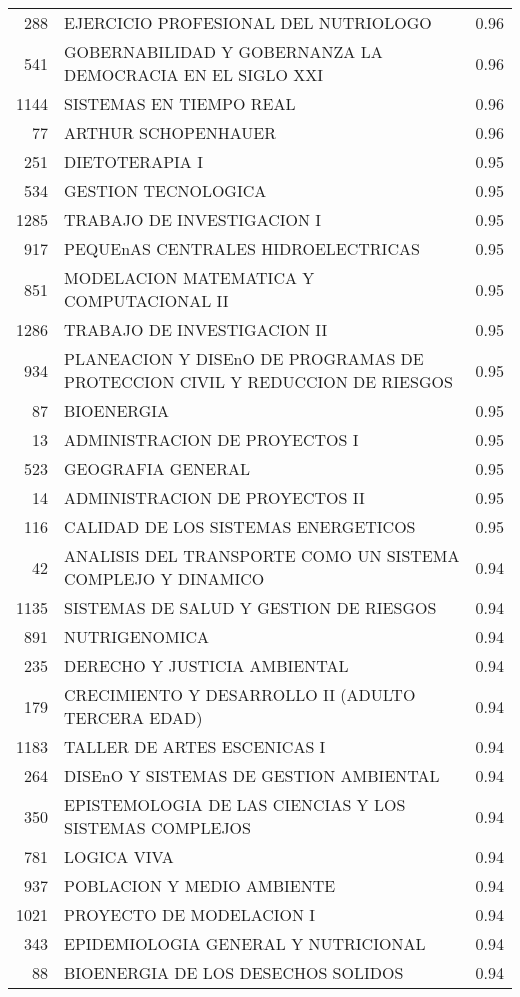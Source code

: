 \begin{table}[ht]
\begin{tabular}{rlr}
  288 & EJERCICIO PROFESIONAL DEL NUTRIOLOGO & 0.96 \\ 
  541 & GOBERNABILIDAD Y GOBERNANZA LA DEMOCRACIA EN EL SIGLO XXI & 0.96 \\ 
  1144 & SISTEMAS EN TIEMPO REAL & 0.96 \\ 
  77 & ARTHUR SCHOPENHAUER & 0.96 \\ 
  251 & DIETOTERAPIA I & 0.95 \\ 
  534 & GESTION TECNOLOGICA & 0.95 \\ 
  1285 & TRABAJO DE INVESTIGACION I & 0.95 \\ 
  917 & PEQUEnAS CENTRALES HIDROELECTRICAS & 0.95 \\ 
  851 & MODELACION MATEMATICA Y COMPUTACIONAL II & 0.95 \\ 
  1286 & TRABAJO DE INVESTIGACION II & 0.95 \\ 
  934 & PLANEACION Y DISEnO DE PROGRAMAS DE PROTECCION CIVIL Y REDUCCION DE RIESGOS & 0.95 \\ 
  87 & BIOENERGIA & 0.95 \\ 
  13 & ADMINISTRACION DE PROYECTOS I & 0.95 \\ 
  523 & GEOGRAFIA GENERAL & 0.95 \\ 
  14 & ADMINISTRACION DE PROYECTOS II & 0.95 \\ 
  116 & CALIDAD DE LOS SISTEMAS ENERGETICOS & 0.95 \\ 
  42 & ANALISIS DEL TRANSPORTE COMO UN SISTEMA COMPLEJO Y DINAMICO & 0.94 \\ 
  1135 & SISTEMAS DE SALUD Y GESTION DE RIESGOS & 0.94 \\ 
  891 & NUTRIGENOMICA & 0.94 \\ 
  235 & DERECHO Y JUSTICIA AMBIENTAL & 0.94 \\ 
  179 & CRECIMIENTO Y DESARROLLO II (ADULTO TERCERA EDAD) & 0.94 \\ 
  1183 & TALLER DE ARTES ESCENICAS I & 0.94 \\ 
  264 & DISEnO Y SISTEMAS DE GESTION AMBIENTAL & 0.94 \\ 
  350 & EPISTEMOLOGIA DE LAS CIENCIAS Y LOS SISTEMAS COMPLEJOS & 0.94 \\ 
  781 & LOGICA VIVA & 0.94 \\ 
  937 & POBLACION Y MEDIO AMBIENTE & 0.94 \\ 
  1021 & PROYECTO DE MODELACION I & 0.94 \\ 
  343 & EPIDEMIOLOGIA GENERAL Y NUTRICIONAL & 0.94 \\ 
  88 & BIOENERGIA DE LOS DESECHOS SOLIDOS & 0.94 \\ 

\end{tabular}
\end{table}
